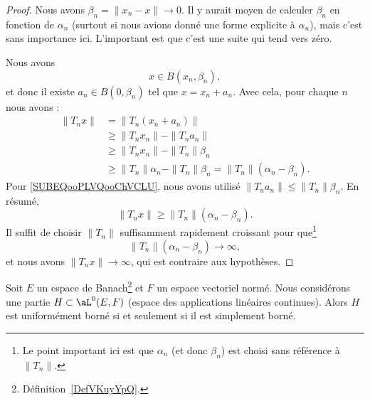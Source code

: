 \begin{proof}
	Nous avons \( \beta_n=\| x_n-x \|\to 0\). Il y aurait moyen de calculer \( \beta_n\) en fonction de \( \alpha_n\) (surtout si nous avions donné une forme explicite à \( \alpha_n\)), mais c'est sans importance ici. L'important est que c'est une suite qui tend vers zéro.

	Nous avons
	\begin{equation}
		x\in B(x_n,\beta_n),
	\end{equation}
	et donc il existe \( a_n\in B(0,\beta_n)\) tel que \( x=x_n+a_n\). Avec cela, pour chaque \( n\) nous avons :
	\begin{subequations}
		\begin{align}
			\| T_nx \| & =\| T_n(x_n+a_n) \|                                                   \\
			           & \geq\| T_nx_n \|-\| T_na_n \|                                         \\
			           & \geq \| T_nx_n \|-\| T_n \|\beta_n    \label{SUBEQooPLVQooChVCLU}     \\
			           & \geq \| T_n \|\alpha_n-\| T_n \|\beta_n =\| T_n \|(\alpha_n-\beta_n).
		\end{align}
	\end{subequations}
	Pour \ref{SUBEQooPLVQooChVCLU}, nous avons utilisé \( \| T_na_n \|\leq \| T_n \|\beta_n\). En résumé,
	\begin{equation}
		\| T_nx \|\geq \| T_n \|(\alpha_n-\beta_n).
	\end{equation}
	Il suffit de choisir \( \| T_n \|\) suffisamment rapidement croissant pour que\footnote{Le point important ici est que \( \alpha_n\) (et donc \( \beta_n\)) est choisi sans référence à \( \| T_n \|\).}
	\begin{equation}
		\| T_n \|(\alpha_n-\beta_n)\to \infty,
	\end{equation}
	et nous avons \( \| T_nx \|\to \infty\), qui est contraire aux hypothèses.
\end{proof}

\begin{theorem} \label{ThoPFBMHBN}
	Soit \( E\) un espace de Banach\footnote{Définition~\ref{DefVKuyYpQ}.} et \( F\) un espace vectoriel normé. Nous considérons une partie \( H\subset \aL^0(E,F)\) (espace des applications linéaires continues). Alors \( H\) est uniformément borné si et seulement si il est simplement borné.
\end{theorem}

